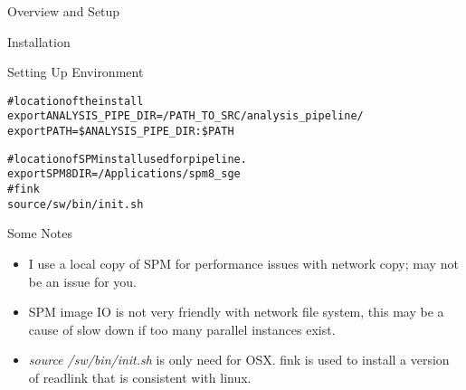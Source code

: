 \documentclass[]{report}
\begin{document}
\begin{chapter}{Overview and Setup}
\begin{section}{Installation}
\begin{subsection}{Setting Up Environment }
\begin{alltt}
#location of the install 
export ANALYSIS_PIPE_DIR=/PATH_TO_SRC/analysis_pipeline/
export PATH=\${ANALYSIS_PIPE_DIR}:\${PATH}

#location of SPM install used for pipeline. 
export SPM8DIR=/Applications/spm8_sge
#fink
source /sw/bin/init.sh
\end{alltt}
{Some Notes}
\begin{itemize}
	\item  I use a local copy of SPM for performance issues with network copy; may not be an issue for you.
	\item  SPM image IO is not very friendly with network file system, this may be a cause of slow down if too many parallel instances exist.
	\item {\it source /sw/bin/init.sh} is only need for OSX. fink is used to install a version of readlink that is consistent with linux.  
\end{itemize}
\end{subsection}

\end{section}



\end{chapter}
\end{document}
